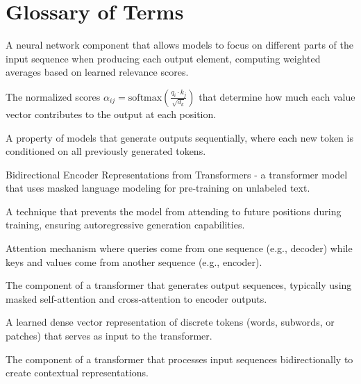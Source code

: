\documentclass[11pt]{article}
\begin{document}
\appendix
\section{Glossary of Terms}

\begin{description}[leftmargin=!,labelwidth=\widthof{\bfseries Multi-Head Attention}]

\item[Attention Mechanism] A neural network component that allows models to focus on different parts of the input sequence when producing each output element, computing weighted averages based on learned relevance scores.

\item[Attention Weights] The normalized scores $\alpha_{ij} = \text{softmax}(\frac{q_i \cdot k_j}{\sqrt{d_k}})$ that determine how much each value vector contributes to the output at each position.

\item[Autoregressive] A property of models that generate outputs sequentially, where each new token is conditioned on all previously generated tokens.

\item[BERT] Bidirectional Encoder Representations from Transformers - a transformer model that uses masked language modeling for pre-training on unlabeled text.

\item[Causal Masking] A technique that prevents the model from attending to future positions during training, ensuring autoregressive generation capabilities.

\item[Cross-Attention] Attention mechanism where queries come from one sequence (e.g., decoder) while keys and values come from another sequence (e.g., encoder).

\item[Decoder] The component of a transformer that generates output sequences, typically using masked self-attention and cross-attention to encoder outputs.

\item[Embedding] A learned dense vector representation of discrete tokens (words, subwords, or patches) that serves as input to the transformer.

\item[Encoder] The component of a transformer that processes input sequences bidirectionally to create contextual representations.


\end{description}
\end{document}
